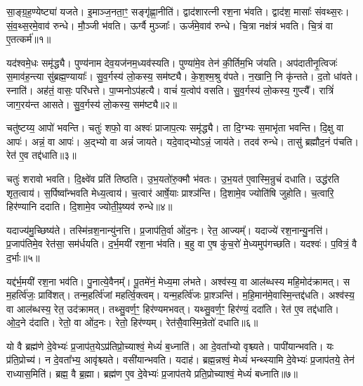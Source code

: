 सा॒ङ्ग्र॒ह॒ण्येष्ट्या॑ यजते।
इ॒माञ्ज॒नता॒ꣳ॒ सङ्गृ॑ह्णा॒नीति॑।
द्वाद॑शारत्नी रश॒ना भ॑वति।
द्वाद॑श॒ मासाः᳚ संवथ्स॒रः।
सं॒व॒थ्स॒रमे॒वाव॑ रुन्धे।
मौ॒ञ्जी भ॑वति।
ऊर्ग्वै मुञ्जाः᳚।
ऊर्ज॑\-मे॒वाव॑ रुन्धे।
चि॒त्रा नक्ष॑त्रं भवति।
चि॒त्रं वा ए॒तत्कर्म॑॥१॥\ip

यद॑श्वमे॒धः समृ॑द्ध्यै।
पुण्य॑नाम देव॒यज॑नम॒ध्यव॑स्यति।
पुण्या॑मे॒व तेन॑ की॒र्तिम॒भि ज॑यति।
अप॑दातीनृ॒त्विजः॑ स॒माव॑ह॒न्त्या सु॑ब्रह्म॒ण्यायाः᳚।
सु॒व॒र्गस्य॑ लो॒कस्य॒ सम॑ष्ट्यै।
के॒श॒श्म॒श्रु व॑पते।
न॒खानि॒ नि कृ॑न्तते।
द॒तो धा॑वते।
स्नाति॑।
अह॑तं॒ वासः॒ परि॑धत्ते।
पा॒प्मनो\-ऽप॑हत्यै।
वाचं॑ य॒त्वोप॑ वसति।
सु॒व॒र्गस्य॑ लो॒कस्य॒ गुप्त्यै᳚।
रात्रिं॑ जाग॒रय॑न्त आसते।
सु॒व॒र्गस्य॑ लो॒कस्य॒ सम॑ष्ट्यै॥२॥\ip\anuvakamend[कर्म॑ धत्ते॒ पञ्च॑ च]

चतु॑ष्टय्य॒ आपो॑ भवन्ति।
चतुः॑ शफो॒ वा अश्वः॑ प्राजाप॒त्यः समृ॑द्ध्यै।
ता दि॒ग्भ्यः स॒माभृ॑ता भवन्ति।
दि॒क्षु वा आपः॑।
अन्नं॒ वा आपः॑।
अ॒द्भ्यो वा अन्नं॑ जायते।
यदे॒वाद्भ्यो\-ऽन्नं॒ जाय॑ते।
तदव॑ रुन्धे।
तासु॑ ब्रह्मौद॒नं प॑चति।
रेत॑ ए॒व तद्द॑धाति॥३॥\ip

चतुः॑ शरावो भवति।
दि॒क्ष्वे॑व प्रति॑ तिष्ठति।
उ॒भ॒यतो॑रु॒क्मौ भ॑वतः।
उ॒भ॒यत॑ ए॒वास्मि॒न्रुचं॑ दधाति।
उद्ध॑रति शृत॒त्वाय॑।
स॒र्पिष्वा᳚न्भवति मेध्य॒त्वाय॑।
च॒त्वार॑ आर्\mbox{}षे॒याः प्राश्ञ॑न्ति।
दि॒शामे॒व ज्योति॑षि जुहोति।
च॒त्वारि॒ हिर॑ण्यानि ददाति।
दि॒शामे॒व ज्योती॒ꣴ॒ष्यव॑ रुन्धे॥४॥\ip

यदाज्य॑मु॒च्छिष्य॑ते।
तस्मि॑न्रश॒नान्यु॑नत्ति।
प्र॒जा\-प॑ति॒र्वा ओ॑द॒नः।
रेत॒ आज्यम्᳚।
यदाज्ये॑ रश॒नान्यु॒नत्ति॑।
प्र॒जा\-प॑तिमे॒व रेत॑सा॒ सम॑र्धयति।
द॒र्भ॒मयी॑ रश॒ना भ॑वति।
ब॒हु वा ए॒ष कु॑च॒रो॑ मे॒ध्यमुप॑गच्छति।
यदश्वः॑।
प॒वित्रं॒ वै द॒र्भाः॥५॥\ip

यद्द॑र्भ॒मयी॑ रश॒ना भव॑ति।
पु॒नात्ये॒वैनम्᳚।
पू॒तमे॑नं॒ मेध्य॒मा ल॑भते।
अश्व॑स्य॒ वा आल॑ब्धस्य महि॒मोद॑क्रामत्।
स म॒हर्त्वि॑जः॒ प्रावि॑शत्।
तन्म॒हर्त्वि॑जां महर्त्वि॒क्त्वम्।
यन्म॒हर्त्वि॑जः प्रा॒श्ञन्ति॑।
म॒हि॒मान॑मे॒वास्मि॒न्तद्द॑धति।
अश्व॑स्य॒ वा आल॑ब्धस्य॒ रेत॒ उद॑क्रामत्।
तथ्सु॒वर्ण॒ꣳ॒ हिर॑ण्यमभवत्।
यथ्सु॒वर्ण॒ꣳ॒ हिर॑ण्यं॒ ददा॑ति।
रेत॑ ए॒व तद्द॑धाति।
ओ॒द॒ने द॑दाति।
रेतो॒ वा ओ॑द॒नः।
रेतो॒ हिर॑ण्यम्।
रेत॑सै॒वास्मि॒न्रेतो॑ दधाति॥६॥\ip\anuvakamend[द॒धा॒ति॒ रु॒न्धे॒ द॒र्भा अ॑भव॒थ्षट् च॑]

यो वै ब्रह्म॑णे दे॒वेभ्यः॑ प्र॒जा\-प॑त॒ये\-ऽप्र॑तिप्रो॒च्याश्वं॒ मेध्यं॑ ब॒ध्नाति॑।
आ दे॒वता᳚भ्यो वृश्च्यते।
पापी॑यान्भवति।
यः प्र॑ति॒प्रोच्य॑।
न दे॒वता᳚भ्य॒ आवृ॑श्च्यते।
वसी॑यान्भवति।
यदाह॑।
ब्रह्म॒न्नश्वं॒ मेध्यं॑ भन्थ्स्यामि दे॒वेभ्यः॑ प्र॒जा\-प॑तये॒ तेन॑ राध्यास॒मिति॑।
ब्रह्म॒ वै ब्र॒ह्मा।
ब्रह्म॑ण ए॒व दे॒वेभ्यः॑ प्र॒जा\-प॑तये प्रति॒प्रोच्याश्वं॒ मेध्यं॑ बध्नाति॥७॥\ip

